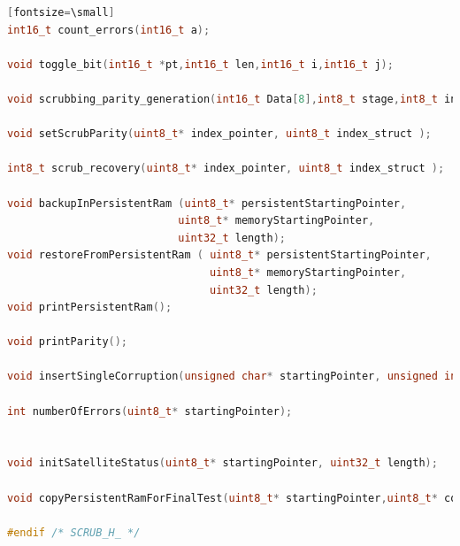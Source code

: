 \documentclass[LaM,binding=0.6cm]{../sapthesis}
\begin{document}
\begin{lstlisting}[language=c][fontsize=\small]
int16_t count_errors(int16_t a);

void toggle_bit(int16_t *pt,int16_t len,int16_t i,int16_t j);

void scrubbing_parity_generation(int16_t Data[8],int8_t stage,int8_t index );

void setScrubParity(uint8_t* index_pointer, uint8_t index_struct );

int8_t scrub_recovery(uint8_t* index_pointer, uint8_t index_struct );

void backupInPersistentRam (uint8_t* persistentStartingPointer,
                           uint8_t* memoryStartingPointer,
                           uint32_t length);
void restoreFromPersistentRam ( uint8_t* persistentStartingPointer,
                                uint8_t* memoryStartingPointer,
                                uint32_t length);
void printPersistentRam();

void printParity();

void insertSingleCorruption(unsigned char* startingPointer, unsigned int length, unsigned char log );

int numberOfErrors(uint8_t* startingPointer);


void initSatelliteStatus(uint8_t* startingPointer, uint32_t length);

void copyPersistentRamForFinalTest(uint8_t* startingPointer,uint8_t* copyStartingPointer, uint32_t length);

#endif /* SCRUB_H_ */
\end{lstlisting}
\end{document}
